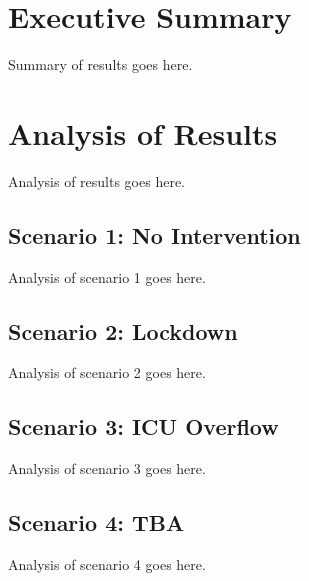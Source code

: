 \documentclass[12pt]{article}\usepackage[]{graphicx}\usepackage[]{color}
\begin{document}
\section{Executive Summary}
Summary of results goes here.

\section{Analysis of Results}
Analysis of results goes here.

\subsection{Scenario 1: No Intervention}
Analysis of scenario 1 goes here.

\subsection{Scenario 2: Lockdown}
Analysis of scenario 2 goes here.

\subsection{Scenario 3: ICU Overflow}
Analysis of scenario 3 goes here.

\subsection{Scenario 4: TBA}
Analysis of scenario 4 goes here.

\end{document}
